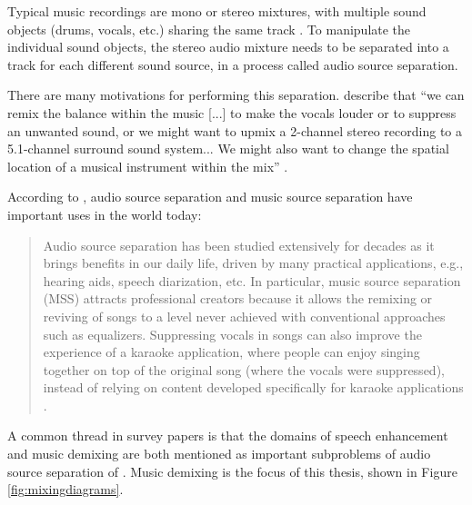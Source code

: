 \documentclass[report.tex]{subfiles}
\begin{document}

Typical music recordings are mono or stereo mixtures, with multiple sound objects (drums, vocals, etc.) sharing the same track \parencite{musicsepintro1}. To manipulate the individual sound objects, the stereo audio mixture needs to be separated into a track for each different sound source, in a process called audio source separation.

There are many motivations for performing this separation. \citeauthor{musicsepgood} describe that ``we can remix the balance within the music [...] to make the vocals louder or to suppress an unwanted sound, or we might want to upmix a 2-channel stereo recording to a 5.1-channel surround sound system... We might also want to change the spatial location of a musical instrument within the mix'' \parencite[31]{musicsepgood}.

According to \citeauthor{mdx21}, audio source separation and music source separation have important uses in the world today:
\begin{quote}
	Audio source separation has been studied extensively for decades as it brings benefits in our daily life, driven by many practical applications, e.g., hearing aids, speech diarization, etc. In particular, music source separation (MSS) attracts professional creators because it allows the remixing or reviving of songs to a level never achieved with conventional approaches such as equalizers. Suppressing vocals in songs can also improve the experience of a karaoke application, where people can enjoy singing together on top of the original song (where the vocals were suppressed), instead of relying on content developed specifically for karaoke applications \parencite[1]{mdx21}.
\end{quote}

A common thread in survey papers is that the domains of speech enhancement and music demixing are both mentioned as important subproblems of audio source separation of \parencite{musicsepintro1, musicmask}. Music demixing is the focus of this thesis, shown in Figure \ref{fig:mixingdiagrams}.
\end{document}
